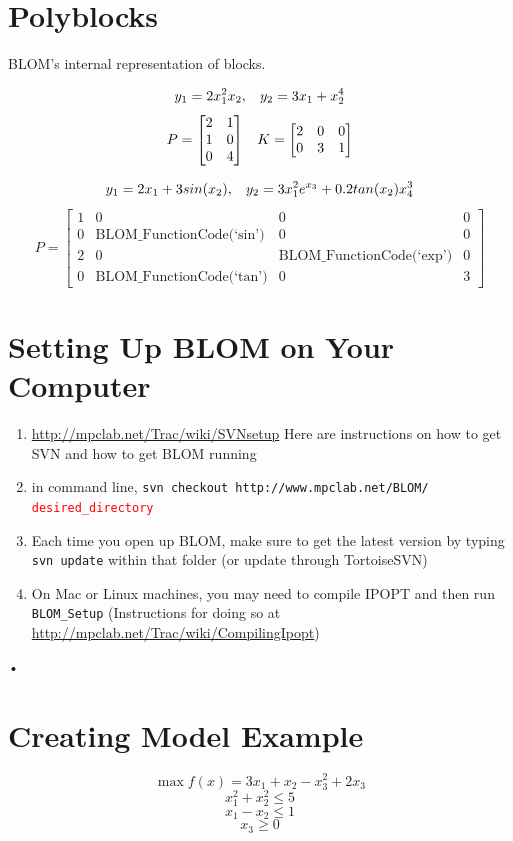 \documentclass[12pt]{report}
\newcommand{\red}[1]{\textcolor{red}{#1}}
\begin{document}
\section{Polyblocks}
BLOM's internal representation of blocks.

$$ y_1=2x^2_1x_2 , \hspace{3mm} y_2=3x_1+x_2^4 $$
\[
P = \begin{bmatrix}
2 & 1 \\
1 & 0 \\
0 & 4
\end{bmatrix}
\hspace{3mm}
K = \begin{bmatrix}
2 & 0 & 0\\
0 & 3 & 1
\end{bmatrix}
\]

$$y_1 = 2x_1+3sin(x_2),  \hspace{3mm} y_2 = 3x_1^2e^{x_3}+0.2tan(x_2)x_4^3$$
\[P= \begin{bmatrix}
1 & 0 & 0 & 0 \\
0 & \text{BLOM\_FunctionCode(`sin')} & 0 & 0\\
2 & 0 & \text{BLOM\_FunctionCode(`exp')} & 0 \\
0 & \text{BLOM\_FunctionCode(`tan')} & 0 & 3
\end{bmatrix}
\]
\section{Setting Up BLOM on Your Computer}
\begin{enumerate}
\item \url{http://mpclab.net/Trac/wiki/SVNsetup} Here are instructions on how to get SVN and how to get BLOM running
\item in command line, \texttt{svn checkout http://www.mpclab.net/BLOM/ \red{desired\_directory}}
\item Each time you open up BLOM, make sure to get the latest version by typing \texttt{svn update} within that folder (or update through TortoiseSVN)
\item On Mac or Linux machines, you may need to compile IPOPT and then run \texttt{BLOM\_Setup} (Instructions for doing so at \url{http://mpclab.net/Trac/wiki/CompilingIpopt})

\end{enumerate}•


\clearpage
\section{Creating Model Example}
\vspace{-20pt}$$\max  f(x)=3x_1+x_2-x_3^2+2x_3$$
$$x_1^2+x_2^2\leq5$$
$$x_1-x_2\leq1$$
$$x_3\geq0$$
\end{document}
